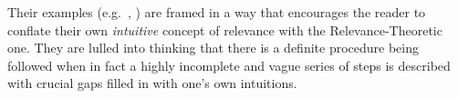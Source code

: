 %
%
%
%
%
%
%
%
%
%

Their examples (e.g.\ \citealt{sw:rt}, \citealt{sw:pmm}) are fram\-ed in a way that encourages the reader to conflate their own \emph{intuitive} concept of relevance with the Relevance-Theoretic one. They are lulled into thinking that there is a definite procedure being followed when in fact a highly incomplete and vague series of steps is described with crucial gaps filled in with one's own intuitions. 


